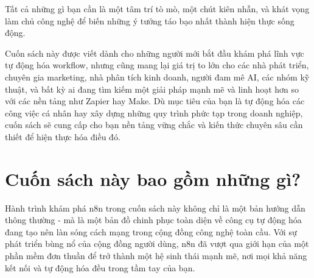 \documentclass[a4paper,12pt,oneside]{book}
\begin{document}
Tất cả những gì bạn cần là một tâm trí tò mò, một chút kiên nhẫn, và khát vọng làm chủ công nghệ để biến những ý tưởng táo bạo nhất thành hiện thực sống động.

Cuốn sách này được viết dành cho những người mới bắt đầu khám phá lĩnh vực tự động hóa workflow, nhưng cũng mang lại giá trị to lớn cho các nhà phát triển, chuyên gia marketing, nhà phân tích kinh doanh, người đam mê AI, các nhóm kỹ thuật, và bất kỳ ai đang tìm kiếm một giải pháp mạnh mẽ và linh hoạt hơn so với các nền tảng như Zapier hay Make. Dù mục tiêu của bạn là tự động hóa các công việc cá nhân hay xây dựng những quy trình phức tạp trong doanh nghiệp, cuốn sách sẽ cung cấp cho bạn nền tảng vững chắc và kiến thức chuyên sâu cần thiết để hiện thực hóa điều đó.

\newpage
\thispagestyle{empty}

\section*{Cuốn sách này bao gồm những gì?}
\begin{center}

\end{center}

Hành trình khám phá n8n trong cuốn sách này không chỉ là một bản hướng dẫn thông thường - mà là một bản đồ chinh phục toàn diện về công cụ tự động hóa đang tạo nên làn sóng cách mạng trong cộng đồng công nghệ toàn cầu. Với sự phát triển bùng nổ của cộng đồng người dùng, n8n đã vượt qua giới hạn của một phần mềm đơn thuần để trở thành một hệ sinh thái mạnh mẽ, nơi mọi khả năng kết nối và tự động hóa đều trong tầm tay của bạn.
\end{document}
